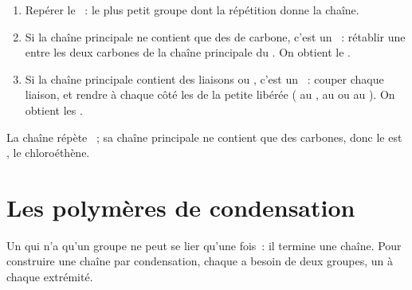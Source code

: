 \begin{method}\label{met:g12:polymers:monomer}
\begin{enumerate}
  \item Repérer le ~: le plus petit groupe dont la répétition donne
        la chaîne.
  \item Si la chaîne principale ne contient que des  de carbone,
        c'est un ~: rétablir une  entre
        les deux carbones de la chaîne principale du . On obtient
        le .
  \item Si la chaîne principale contient des liaisons  ou ,
        c'est un ~: couper chaque liaison, et
        rendre à chaque côté les  de la petite  libérée
        ( au
        ,  au  ou au ). On obtient les
        .
\end{enumerate}
\end{method}

\begin{example}\label{ex:g12:polymers:pvc}
La chaîne  répète ~;
sa chaîne principale ne contient que des carbones, donc le  est
, le chloroéthène.
\end{example}

\section{Les polymères de condensation}

Un  qui n'a qu'un groupe  ne peut se lier qu'une fois~:
il termine une chaîne. Pour construire une chaîne par condensation,
chaque  a besoin de deux groupes, un à chaque extrémité.

